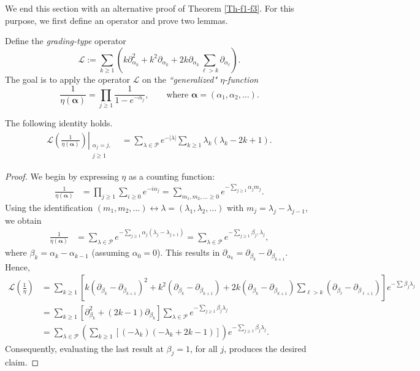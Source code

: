 \documentclass[a4paper,reqno,12pt]{amsart}
\begin{document}
We end this section with an alternative proof of Theorem \ref{Th-f1-f3}. For this purpose, we first define an operator and prove two lemmas. 

Define the \emph{grading-type} operator 
$$\mathcal{L}:=\sum_{k\geq1} (k\partial_{\alpha_k}^2+k^2\partial_{\alpha_k}+2k\partial_{\alpha_k}\sum_{\ell>k}\partial_{\alpha_{\ell}}).$$ 
The goal is to apply the operator $\mathcal{L}$ on the \emph{``generalized" $\eta$-function}
$$\frac1{\eta(\pmb{\alpha})} =\prod_{j\geq1} \frac1{1-e^{-\alpha_j}}, \qquad \text{where $\pmb{\alpha}=(\alpha_1,\alpha_2,\dots)$}. $$


\begin{lemma} \label{altlemma1} The following identity holds. 
\begin{align*}   \left. \mathcal{L} \left(\frac1{\eta({\pmb{\alpha}})}\right) \right\vert_{\substack{\alpha_j=j, \\ j\geq 1}}
& = \sum_{\lambda\in \mathcal{P}} e^{-\vert\lambda\vert}\sum_{k\geq1} \lambda_k(\lambda_k-2k+1).
\end{align*}
\end{lemma}

\begin{proof} We begin by expressing $\eta$ as a counting function:
\begin{align*}  \frac1{\eta(\pmb{\alpha})} & = \prod_{j\geq1} \sum_{i\geq0} e^{-i\alpha_j} = \sum_{m_1, m_2, \dots\geq0} e^{-\sum_{j\geq1} \alpha_j m_j}.
\end{align*}
Using the identification  $(m_1, m_2, \dots) \longleftrightarrow \lambda=(\lambda_1, \lambda_2, \dots)$ with  $m_j=\lambda_j-\lambda_{j-1}$,  we obtain
\begin{align*} \frac1{\eta(\pmb{\alpha})} & = \sum_{\lambda\in\mathcal{P}} e^{-\sum_{j\geq1} \alpha_j(\lambda_j-\lambda_{j+1})}
=  \sum_{\lambda\in\mathcal{P}} e^{-\sum_{j\geq1} \beta_j, \lambda_j},
\end{align*} 
where $\beta_k=\alpha_k-\alpha_{k-1}$ (assuming $\alpha_0=0$). This results in $\partial_{\alpha_k} = \partial_{\beta_k}-\partial_{\beta_{k+1}}$. Hence,
\begin{align*}  \mathcal{L} \left(\frac1{\eta}\right)
 &= \sum_{k\geq1} \left[k(\partial_{\beta_k}-\partial_{\beta_{k+1}})^2  + k^2(\partial_{\beta_k}-\partial_{\beta_{k+1}}) +2k(\partial_{\beta_k}-\partial_{\beta_{k+1}})
\sum_{\ell>k} (\partial_{\beta_{\ell}}-\partial_{\beta_{\ell+1}}) \right] 
e^{-\sum\beta_j \lambda_j}\\
&=  \sum_{k\geq1} \left[\partial_{\beta_k}^2+(2k-1)\partial_{\beta_k} \right] \sum_{\lambda\in\mathcal{P}} e^{-\sum_{j\geq1} \beta_j \lambda_j}  \\
&= \sum_{\lambda\in\mathcal{P}}  \left( \sum_{k\geq1} [(-\lambda_k)(-\lambda_k+2k-1)] \right)  e^{-\sum_{j\geq1} \beta_j \lambda_j}.
\end{align*}
Consequently, evaluating the last result at $\beta_j=1$, for all $j$, produces the desired claim.
\end{proof}
\end{document}
